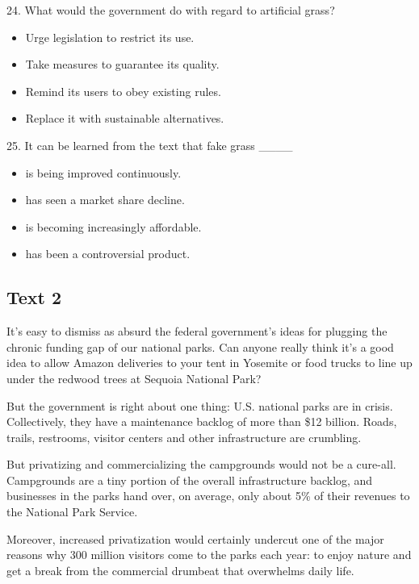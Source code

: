 \documentclass[UTF8,11pt]{ctexart}
\begin{document}
24. What would the government do with regard to artificial grass?


\begin{itemize}[leftmargin=2em,itemsep=.2em,topsep=.4em]\item[A.] Urge legislation to restrict its use.
\item[B.] Take measures to guarantee its quality.
\item[C.] Remind its users to obey existing rules.
\item[D.] Replace it with sustainable alternatives.
\end{itemize}

25. It can be learned from the text that fake grass \_\_\_\_


\begin{itemize}[leftmargin=2em,itemsep=.2em,topsep=.4em]\item[A.] is being improved continuously.
\item[B.] has seen a market share decline.
\item[C.] is becoming increasingly affordable.
\item[D.] has been a controversial product.
\end{itemize}

\subsection*{\textbf{Text 2}}


It’s easy to dismiss as absurd the federal government’s ideas for plugging the chronic funding gap of our national parks. Can anyone really think it’s a good idea to allow Amazon deliveries to your tent in Yosemite or food trucks to line up under the redwood trees at Sequoia National Park?


But the government is right about one thing: U.S. national parks are in crisis. Collectively, they have a maintenance backlog of more than \$12 billion. Roads, trails, restrooms, visitor centers and other infrastructure are crumbling.


But privatizing and commercializing the campgrounds would not be a cure-all. Campgrounds are a tiny portion of the overall infrastructure backlog, and businesses in the parks hand over, on average, only about 5\% of their revenues to the National Park Service.


Moreover, increased privatization would certainly undercut one of the major reasons why 300 million visitors come to the parks each year: to enjoy nature and get a break from the commercial drumbeat that overwhelms daily life.
\end{document}
